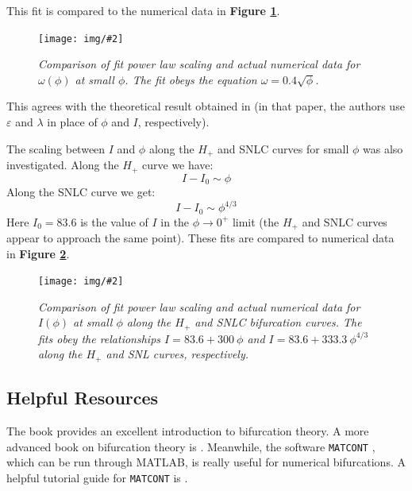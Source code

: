 \documentclass[letterpaper,12pt]{article}
\numberwithin{table}{section}
\numberwithin{figure}{section}
\numberwithin{equation}{section}
\newcommand{\centerfig}[2]{\begin{center}\texttt{[image: img/\#2]}\end{center}}
\newcommand{\ccaption}[1]{\caption{\textit{#1}}}
\newcommand{\reffig}[1]{\textbf{Figure \ref{#1}}}
\begin{document}
\begin{flushleft}
    This fit is compared to the numerical data in \reffig{fig:phi-im-scale}.
    \begin{figure}[!h]

        \centering
 
        \centerfig{0.8}{phi-im-scale.jpg}
    
        \captionsetup{width=0.8\linewidth}
        \ccaption{Comparison of fit power law scaling and actual numerical data for $\omega(\phi)$ at small $\phi$. The fit obeys the equation $\omega = 0.4\sqrt{\phi}$.}
        \label{fig:phi-im-scale}
    
    \end{figure}

    This agrees with the theoretical result obtained in \cite{baer} (in that paper, the authors use $\varepsilon$ and $\lambda$ in place of $\phi$ and $I$, respectively).

    The scaling between $I$ and $\phi$ along the $H_+$ and SNLC curves for small $\phi$ was also investigated. Along the $H_+$ curve we have:
    \begin{equation}
        I - I_0 \sim \phi
    \end{equation}
    Along the SNLC curve we get:
    \begin{equation}
        I - I_0 \sim \phi^{4/3}
    \end{equation}
    Here $I_0 = 83.6$ is the value of $I$ in the $\phi \to 0^+$ limit (the $H_+$ and SNLC curves appear to approach the same point). These fits are compared to numerical data in \reffig{fig:bif-scale}.
    \begin{figure}[!h]

        \centering
 
        \centerfig{0.8}{bif-scale.jpg}
    
        \captionsetup{width=0.8\linewidth}
        \ccaption{Comparison of fit power law scaling and actual numerical data for $I(\phi)$ at small $\phi$ along the $H_+$ and SNLC bifurcation curves. The fits obey the relationships $I = 83.6 + 300 \: \phi$ and $I = 83.6 + 333.3 \: \phi^{4/3}$ along the $H_+$ and SNL curves, respectively.}
        \label{fig:bif-scale}
    
    \end{figure}

    \subsection{Helpful Resources}
    The book \cite{strogatz} provides an excellent introduction to bifurcation theory. A more advanced book on bifurcation theory is \cite{kuznetsov}. Meanwhile, the software \texttt{MATCONT} \cite{matcont}, which can be run through MATLAB, is really useful for numerical bifurcations. A helpful tutorial guide for \texttt{MATCONT} is \cite{matcont-tut}.


\end{flushleft}
\end{document}
